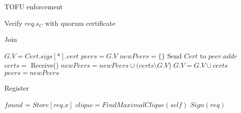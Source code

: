 \label{CheckTOFU}
\begin{algorithm}
  \caption{TOFU enforcement}
  \SetAlgoNoLine
  Verify $req.s_C$ with quorum certificate\;
\end{algorithm}

\ifdefined\ABSTRACT
\else

\label{Join}
\begin{algorithm}
  \caption{Join}
  \SetAlgoNoLine
  $G.V = Cert.sigs[*].cert$\;
  $peers = G.V$\;
  {
    $newPeers = \{\}$\;
    {
      Send $Cert$ to $peer.addr$\;
      $certs = $ Receive()\;
      $newPeers = newPeers \cup (certs \setminus G.V$)\;
      $G.V = G.V \cup certs$\;
    }
    $peers = newPeers$\;
  }
\end{algorithm}

\label{Register}
\begin{algorithm}
  \caption{Register}
  \SetAlgoNoLine
  $found$ = $Store[req.x]$\;
  {
    $clique = FindMaximalClique(self)$\;
    {
      $Sign(req)$\;
    }
  }
\end{algorithm}

\fi
